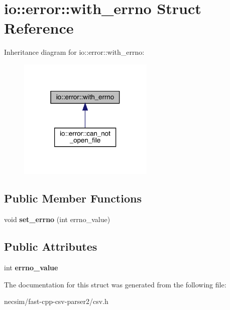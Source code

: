 \hypertarget{structio_1_1error_1_1with__errno}{}\section{io\+:\+:error\+:\+:with\+\_\+errno Struct Reference}
\label{structio_1_1error_1_1with__errno}


Inheritance diagram for io\+:\+:error\+:\+:with\+\_\+errno\+:\nopagebreak
\begin{figure}[H]
\begin{center}
\leavevmode
\includegraphics[width=183pt]{structio_1_1error_1_1with__errno__inherit__graph}
\end{center}
\end{figure}
\subsection*{Public Member Functions}
\begin{DoxyCompactItemize}
\item 
void {\bfseries set\+\_\+errno} (int errno\+\_\+value)\hypertarget{structio_1_1error_1_1with__errno_a572cfa4b4a96792cd1d17dc9ad2eb5a9}{}\label{structio_1_1error_1_1with__errno_a572cfa4b4a96792cd1d17dc9ad2eb5a9}

\end{DoxyCompactItemize}
\subsection*{Public Attributes}
\begin{DoxyCompactItemize}
\item 
int {\bfseries errno\+\_\+value}\hypertarget{structio_1_1error_1_1with__errno_a99dcacba02cb53351fe64d7e064406be}{}\label{structio_1_1error_1_1with__errno_a99dcacba02cb53351fe64d7e064406be}

\end{DoxyCompactItemize}


The documentation for this struct was generated from the following file\+:\begin{DoxyCompactItemize}
\item 
necsim/fast-\/cpp-\/csv-\/parser2/csv.\+h\end{DoxyCompactItemize}
